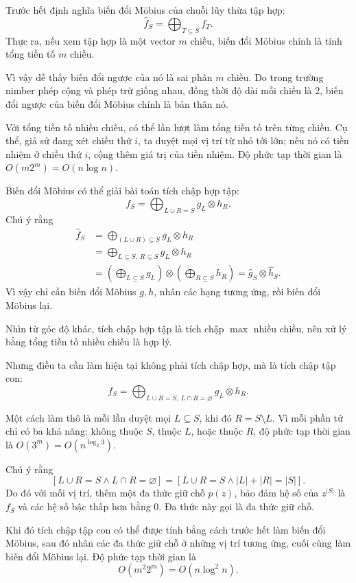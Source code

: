 \documentclass[11pt]{article}
\begin{document}
Trước hết định nghĩa biến đổi Möbius của chuỗi lũy thừa tập hợp:
\[
  \hat f_S=\bigoplus_{T\subseteq S} f_T.
\]
Thực ra, nếu xem tập hợp là một vector \(m\) chiều, biến đổi Möbius chính là
tính tổng tiền tố \(m\) chiều.

Vì vậy dễ thấy biến đổi ngược của nó là sai phân \(m\) chiều. Do trong trường
nimber phép cộng và phép trừ giống nhau, đồng thời độ dài mỗi chiều là \(2\),
biến đổi ngược của biến đổi Möbius chính là bản thân nó.

Với tổng tiền tố nhiều chiều, có thể lần lượt làm tổng tiền tố trên từng chiều.
Cụ thể, giả sử đang xét chiều thứ \(i\), ta duyệt mọi vị trí từ nhỏ tới lớn; nếu
nó có tiền nhiệm ở chiều thứ \(i\), cộng thêm giá trị của tiền nhiệm. Độ phức
tạp thời gian là \(O(m2^m)=O(n\log n)\).

Biến đổi Möbius có thể giải bài toán tích chập hợp tập:
\[
  f_S=\bigoplus_{L\cup R=S} g_L\otimes h_R.
\]
Chú ý rằng
\[
\begin{aligned}
\hat f_S
&=\bigoplus_{(L\cup R)\subseteq S} g_L\otimes h_R\\
&=\bigoplus_{L\subseteq S,\ R\subseteq S} g_L\otimes h_R\\
&=\left(\bigoplus_{L\subseteq S}g_L\right)\otimes
  \left(\bigoplus_{R\subseteq S}h_R\right)
 =\hat g_S\otimes\hat h_S.
\end{aligned}
\]
Vì vậy chỉ cần biến đổi Möbius \(g,h\), nhân các hạng tương ứng, rồi biến đổi
Möbius lại.

Nhìn từ góc độ khác, tích chập hợp tập là tích chập \(\max\) nhiều chiều, nên xử
lý bằng tổng tiền tố nhiều chiều là hợp lý.

Nhưng điều ta cần làm hiện tại không phải tích chập hợp, mà là tích chập tập
con:
\[
  f_S=\bigoplus_{L\cup R=S,\ L\cap R=\varnothing} g_L\otimes h_R.
\]

Một cách làm thô là mỗi lần duyệt mọi \(L\subseteq S\), khi đó \(R=S\setminus
L\). Vì mỗi phần tử chỉ có ba khả năng: không thuộc \(S\), thuộc \(L\), hoặc
thuộc \(R\), độ phức tạp thời gian là \(O(3^m)=O(n^{\log_2 3})\).

Chú ý rằng
\[
  [L\cup R=S\land L\cap R=\varnothing]
  =
  [L\cup R=S\land |L|+|R|=|S|].
\]
Do đó với mỗi vị trí, thêm một đa thức giữ chỗ \(p(z)\), bảo đảm hệ số của
\(z^{|S|}\) là \(f_S\) và các hệ số bậc thấp hơn bằng \(0\). Đa thức này gọi là
đa thức giữ chỗ.

Khi đó tích chập tập con có thể được tính bằng cách trước hết làm biến đổi
Möbius, sau đó nhân các đa thức giữ chỗ ở những vị trí tương ứng, cuối cùng làm
biến đổi Möbius lại. Độ phức tạp thời gian là
\[
  O(m^2 2^m)=O(n\log^2 n).
\]
\end{document}
